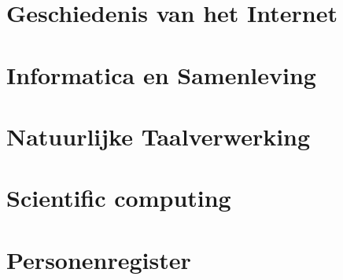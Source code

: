 \documentclass[11pt]{article}
\theoremstyle{definition}
\begin{document}
\section{Geschiedenis van het Internet}

\newpage

\section{Informatica en Samenleving}

\newpage

\section{Natuurlijke Taalverwerking}

\newpage

\section{Scientific computing}

\newpage

\appendix
\section{Personenregister}



\printindex

%
%
\nocite{*}
\end{document}
